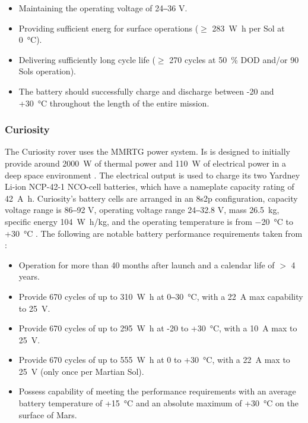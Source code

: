 \begin{itemize}
  \item Maintaining the operating voltage of 24‒36 \si{\volt}.
  \item Providing sufficient energ for surface operations ($\geq$ \SI{283}{\watt\hour} per Sol at \SI{0}{\celsius}).
  \item Delivering sufficiently long cycle life ($\geq$ 270 cycles at \SI{50}{\percent} \ac{DOD} and/or 90 Sols operation).
  \item The battery should successfully charge and discharge between -20 and +\SI{30}{\celsius} throughout the length of the entire mission.
\end{itemize}

\subsubsection{Curiosity}
The Curiosity rover uses the \ac{MMRTG} power system. Is is designed to initially provide around \SI{2000}{\watt} of thermal power and \SI{110}{\watt} of electrical power in a deep space environment . The electrical output is used to charge its two Yardney \ac{Li-ion} NCP-42-1 \ac{NCO}-cell batteries, which have a nameplate capacity rating of \SI{42}{\ampere\hour}. Curiosity's battery cells are arranged in an 8s2p configuration, capacity voltage range is 86‒92 \si{\volt}, operating voltage range 24‒32.8 \si{\volt}, mass \SI{26.5}{\kilo\gram}, specific energy \SI{104}{\watt\hour/\kilo\gram}, and the operating temperature is from \SI{-20}{\celsius} to +\SI{30}{\celsius} . The following are notable battery performance requirements taken from :

\begin{itemize}
  \item Operation for more than 40 months after launch and a calendar life of $>$ 4 years.
  \item Provide 670 cycles of up to \SI{310}{\watt\hour} at 0‒\SI{30}{\celsius}, with a \SI{22}{\ampere} max capability to \SI{25}{\volt}.
  \item Provide 670 cycles of up to \SI{295}{\watt\hour} at -20 to +\SI{30}{\celsius}, with a \SI{10}{\ampere} max to \SI{25}{\volt}.
  \item Provide 670 cycles of up to \SI{555}{\watt\hour} at 0 to +\SI{30}{\celsius}, with a \SI{22}{\ampere}  max to \SI{25}{\volt} (only once per Martian Sol).
  \item Possess capability of meeting the performance requirements with an average battery temperature of +\SI{15}{\celsius} and an absolute maximum of +\SI{30}{\celsius} on the surface of Mars.
\end{itemize}
